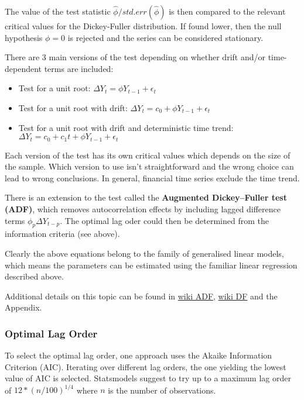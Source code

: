 \documentclass{article}
\providecommand{\tightlist}{%
      \setlength{\itemsep}{0pt}\setlength{\parskip}{0pt}}
\begin{document}
The value of the test statistic \(\hat{\phi}/std.err(\hat{\phi})\) is
then compared to the relevant critical values for the Dickey-Fuller
distribution. If found lower, then the null hypothesis \(\phi=0\) is
rejected and the series can be considered stationary.

There are 3 main versions of the test depending on whether drift and/or
time-dependent terms are included:

\begin{itemize}
\tightlist
\item
  Test for a unit root: \(\Delta Y_t = \phi Y_{t-1} + \epsilon_t\)
\item
  Test for a unit root with drift:
  \(\Delta Y_t = c_0 + \phi Y_{t-1} + \epsilon_t\)
\item
  Test for a unit root with drift and deterministic time trend:
  \(\Delta Y_t = c_0 + c_1 t + \phi Y_{t-1} + \epsilon_t\)
\end{itemize}

Each version of the test has its own critical values which depends on
the size of the sample. Which version to use isn't straightforward and
the wrong choice can lead to wrong conclusions. In general, financial
time series exclude the time trend.

There is an extension to the test called the \textbf{Augmented
Dickey--Fuller test (ADF)}, which removes autocorrelation effects by
including lagged difference terms \(\phi_p \Delta Y_{t-p}\). The optimal
lag oder could then be determined from the information criteria (see
above).

Clearly the above equations belong to the family of generalised linear
models, which means the parameters can be estimated using the familiar
linear regression described above.

Additional details on this topic can be found in
\href{https://en.wikipedia.org/wiki/Augmented_Dickey\%E2\%80\%93Fuller_test}{wiki
ADF},
\href{https://en.wikipedia.org/wiki/Dickey\%E2\%80\%93Fuller_test}{wiki
DF} and the Appendix.

    \subsubsection{Optimal Lag Order}\label{optimal-lag-order}

To select the optimal lag order, one approach uses the Akaike
Information Criterion (AIC). Iterating over different lag orders, the
one yielding the lowest value of AIC is selected. Statsmodels suggest to
try up to a maximum lag order of \(12*(n/100)^{1/4}\) where \(n\) is the
number of observations.
\end{document}
